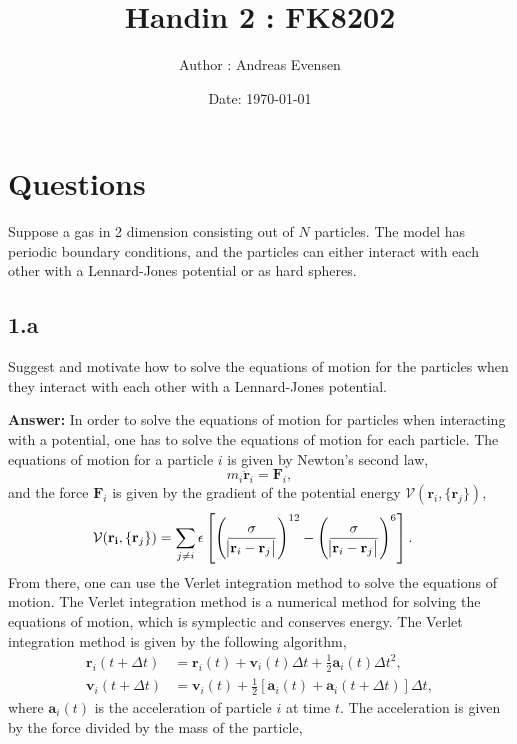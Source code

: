 \documentclass[a4paper]{article}
\title{Handin 2 : FK8202}
\author{Author : Andreas Evensen}
\date{Date: \today}
\newcommand{\newparagraph}{\vspace{.5cm}\noindent}
\begin{document}
\maketitle

\section{Questions}
Suppose a gas in 2 dimension consisting out of $N$ particles. The model has periodic boundary conditions, and the particles can either interact with each other with {\color{red}a Lennard-Jones potential} or {\color{blue}as hard spheres}.
\begin{figure}[H]
    \centering
\end{figure}
\subsection*{1.a}
Suggest and motivate how to solve the equations of motion for the particles when they interact with each other with a {\color{red} Lennard-Jones potential}.

\newparagraph
\textbf{Answer:} In order to solve the equations of motion for particles when interacting with a potential, one has to solve the equations of motion for each particle. The equations of motion for a particle $i$ is given by Newton's second law,
\begin{equation*}
    m_i\ddot{\mathbf{r}}_i = \mathbf{F}_i,
\end{equation*}and the force $\mathbf{F}_i$ is given by the gradient of the potential energy $\mathcal{V}(\mathbf{r}_i, \{\mathbf{r}_j\})$,
\begin{align*}
    \mathcal{V}(\mathbf{r_i}, \{\mathbf{r}_j\}) &= \sum_{j\neq i} \epsilon\left[\left(\frac{\sigma}{\abs{\mathbf{r}_i - \mathbf{r}_j}}\right)^{12} - \left(\frac{\sigma}{\abs{\mathbf{r}_i - \mathbf{r}_j}}\right)^{6}\right].
\end{align*}From there, one can use the Verlet integration method to solve the equations of motion. The Verlet integration method is a numerical method for solving the equations of motion, which is symplectic and conserves energy. The Verlet integration method is given by the following algorithm,
\begin{align*}
    \mathbf{r}_i(t + \Delta t) &= \mathbf{r}_i(t) + \mathbf{v}_i(t)\Delta t + \frac{1}{2}\mathbf{a}_i(t)\Delta t^2,\\
    \mathbf{v}_i(t + \Delta t) &= \mathbf{v}_i(t) + \frac{1}{2}\left[\mathbf{a}_i(t) + \mathbf{a}_i(t + \Delta t)\right]\Delta t,
\end{align*}where $\mathbf{a}_i(t)$ is the acceleration of particle $i$ at time $t$. The acceleration is given by the force divided by the mass of the particle,
\end{document}
